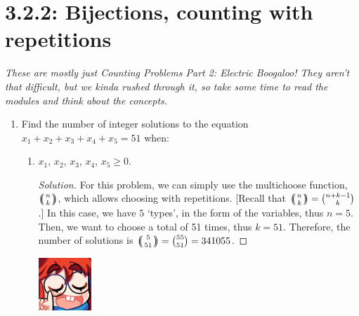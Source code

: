 \documentclass{article}
\newcommand{\multibinom}[2]{
  \left(\!\!\middle(\genfrac{}{}{0pt}{}{#1}{#2}\middle)\!\!\right)} %
\newenvironment{solution}
  {\renewcommand\qedsymbol{$\blacksquare$}\begin{proof}[Solution]}
  {\end{proof}}
\begin{document}
\pagebreak
\section*{3.2.2: Bijections, counting with repetitions}
\textit{These are mostly just Counting Problems Part 2: Electric Boogaloo! They aren't that difficult, but we kinda rushed through it, so take some time to read the modules and think about the concepts.}
\begin{enumerate} 
    \item Find the number of integer solutions to the equation $ x_1 + x_2 + x_3 + x_4 + x_5 = 51 $ when:\begin{enumerate} 
        \item $x_1$, $x_2$, $x_3$, $x_4$, $x_5 \geq 0$.\begin{solution} 
            For this problem, we can simply use the multichoose function, $\multibinom{n}{k}$, which allows choosing with repetitions. [Recall that $\multibinom{n}{k} = \binom{n+k-1}{k}$.]
            In this case, we have $5$ `types', in the form of the variables, thus $n = 5$. Then, we want to choose a total of 51 times, thus $k=51$. Therefore, the number of solutions is $\multibinom{5}{51} = \binom{55}{51} = 341055$.  
        \end{solution} 
        \parindent=-20.0pt \begin{minipage}[t]{.14\textwidth}
            \vspace{0pt}
            \includegraphics[width=2cm]{nerd_maddy.png} 
        \end{minipage}%
\end{enumerate}
\end{enumerate}
\end{document}
